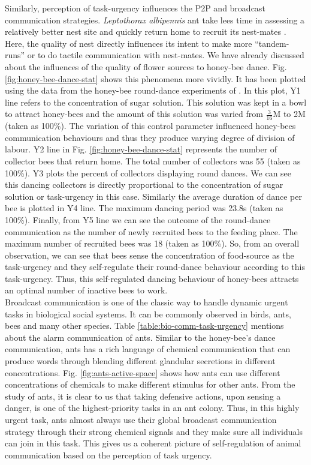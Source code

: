 Similarly, perception of task-urgency influences the P2P and broadcast communication strategies. {\em Leptothorax albipennis} ant take lees time in assessing a relatively better nest site and quickly return home to recruit its nest-mates \cite{Pratt+2002}. Here, the quality of nest directly influences its intent to make more ``tandem-runs'' or to do tactile communication with nest-mates. We have already discussed about the influences of the quality of  flower sources to honey-bee dance.  Fig. \ref{fig:honey-bee-dance-stat} shows this phenomena more vividly. It has been plotted using the data from the honey-bee round-dance experiments of . In this plot, Y1 line refers to the concentration of sugar solution. This solution was kept in a bowl  to attract honey-bees and the amount of this solution was varied from $\frac{3}{16}$M to 2M (taken as 100\%).  The variation of this control parameter influenced honey-bees communication behaviours and thus they produce varying degree of division of labour. Y2 line in Fig. \ref{fig:honey-bee-dance-stat} represents the number of collector bees that return home. The total number of collectors was 55 (taken as 100\%). Y3 plots the percent of collectors displaying round dances. We can see this dancing collectors is directly proportional to the concentration of sugar solution or task-urgency in this case. Similarly the average duration of dance per bee  is plotted in Y4 line. The maximum dancing period was 23.8s (taken as 100\%). Finally, from Y5 line we can see the outcome of the round-dance communication as the number of newly recruited bees to the feeding place. The maximum number of recruited bees was 18 (taken as 100\%). So, from an overall observation, we can see that bees sense the concentration of food-source  as the task-urgency and they self-regulate their round-dance behaviour according to this task-urgency. Thus, this self-regulated dancing behaviour of honey-bees attracts an optimal number of inactive bees to work.\\ 
Broadcast communication is one of the classic way to handle dynamic urgent tasks in biological social systems. It can be commonly observed in birds, ants, bees and many other species. Table \ref{table:bio-comm-task-urgency} mentions about the alarm communication of ants. Similar to the honey-bee's dance communication, ants has a rich language of chemical communication that can produce words through blending different glandular secretions in different concentrations. Fig. \ref{fig:ants-active-space} shows how ants can use different concentrations of chemicals to make different stimulus for other ants. From the study of ants, it is clear to us that taking defensive actions, upon sensing a danger, is one of the highest-priority tasks in an ant colony. Thus, in this highly urgent task, ants almost always use their global broadcast communication strategy through their strong chemical signals and they make sure all individuals can join in this task.  This gives us a coherent picture of self-regulation of animal communication based on the perception of task urgency.
